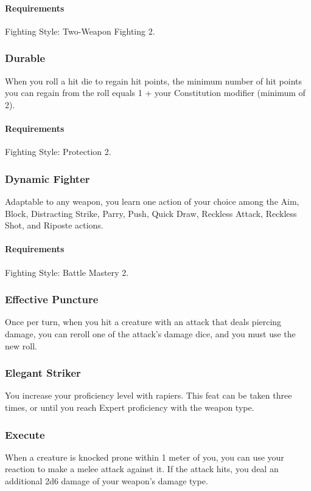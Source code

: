     \paragraph{Requirements} Fighting Style: Two-Weapon Fighting 2.
\subsubsection{Durable} \label{feat::durable}
    When you roll a hit die to regain hit points, the minimum number of hit points you can regain from the roll equals 1 + your Constitution modifier (minimum of 2).
    \paragraph{Requirements} Fighting Style: Protection 2.
\subsubsection{Dynamic Fighter} \label{feat::dynamicfighter}
    Adaptable to any weapon, you learn one action of your choice among the Aim, Block, Distracting Strike, Parry, Push, Quick Draw, Reckless Attack, Reckless Shot, and Riposte actions.
    \paragraph{Requirements} Fighting Style: Battle Mastery 2.
\subsubsection{Effective Puncture} \label{feat::effectivepuncture}
    Once per turn, when you hit a creature with an attack that deals piercing damage, you can reroll one of the attack's damage dice, and you must use the new roll.
\subsubsection{Elegant Striker} \label{feat::elegantstriker}
    You increase your proficiency level with rapiers.
    This feat can be taken three times, or until you reach Expert proficiency with the weapon type.
\subsubsection{Execute} \label{feat::execute}
    When a creature is knocked prone within 1 meter of you, you can use your reaction to make a melee attack against it.
    If the attack hits, you deal an additional 2d6 damage of your weapon's damage type.
